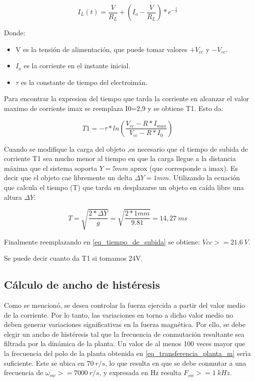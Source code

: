 \begin{equation}
	I_L(t)=\frac{V}{R_L} + (I_o-\frac{V}{R_L})*e^{-\frac{t}{\tau}}
\end{equation}

Donde:
\begin{itemize}
	\item V es la tensión de alimentación, que puede tomar valores $+V_{cc}$ y $-V_{cc}$.
	\item $I_o$ es la corriente en el instante inicial.
	\item $\tau$ es la constante de tiempo del electroimán.
\end{itemize}

Para encontrar la expresion del tiempo que tarda la corriente en alcanzar el valor maximo de corriente imax se reemplaza I0=2,9 y se obtiene T1. Esto da:

\begin{equation}\label{eq_tiempo_de_subida}
	T1=-\tau*ln(\frac{V_{cc}-R*I_{max}}{V_{cc}-R*I_{0}})
\end{equation}

Cuando se modifique la carga del objeto ,es necesario que el tiempo de subida de corriente T1 sea mucho menor al tiempo en que la carga llegue a la distancia máxima que el sistema soporta $Y=5mm$ aprox (que corresponde a imax). Es decir que el objeto cae libremente un delta $\Delta Y= 1mm $. Utilizando la ecuación que calcula el tiempo (T) que tarda en desplazarse un objeto en caída libre una altura $\Delta Y$:

\begin{equation}
	T=\sqrt{\frac{2*\Delta Y}{g}}=\sqrt{\frac{2*1mm}{9.81}}=14,27\:ms
\end{equation}

Finalmente reemplazando en \ref{eq_tiempo_de_subida} se obtiene: $Vcc>=21.6\:V$.

Se puede decir cuanto da T1 si tomamos 24V.

\subsection{Cálculo de ancho de histéresis}

Como se mencionó, se desea controlar la fuerza ejercida a partir del valor medio de la corriente. Por lo tanto, las variaciones en torno a dicho valor medio no deben generar variaciones significativas en la fuerza magnética. Por ello, se debe elegir un ancho de histéresis tal que la frecuencia de conmutación resultante sea filtrada por la dinámica de la planta. Un valor de al menos 100 veces mayor que la frecuencia del polo de la planta obtenida en \ref{eq_transferencia_planta_m} serìa suficiente. Este se ubica en $70\:r/s$, lo que resulta en que se debe conmutar a una frecuencia de $\omega_{sw}>=7000\:r/s$, y expresada en Hz resulta $F_{sw}>=1\:kHz$.


